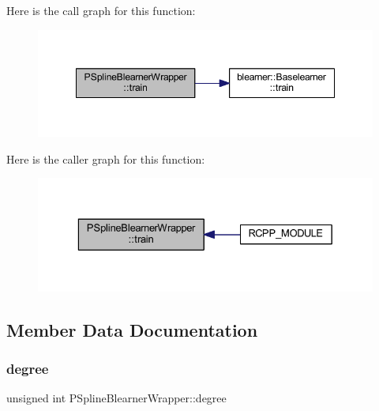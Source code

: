 Here is the call graph for this function\+:
\nopagebreak
\begin{figure}[H]
\begin{center}
\leavevmode
\includegraphics[width=348pt]{class_p_spline_blearner_wrapper_a10193fd93f82c2c333e704d7cb67dd27_cgraph}
\end{center}
\end{figure}
Here is the caller graph for this function\+:
\nopagebreak
\begin{figure}[H]
\begin{center}
\leavevmode
\includegraphics[width=329pt]{class_p_spline_blearner_wrapper_a10193fd93f82c2c333e704d7cb67dd27_icgraph}
\end{center}
\end{figure}


\subsection{Member Data Documentation}
\mbox{\label{class_p_spline_blearner_wrapper_a3828bb3245f840146ed83b0f9b3777f3}} 
\subsubsection{\texorpdfstring{degree}{degree}}
{\footnotesize\ttfamily unsigned int P\+Spline\+Blearner\+Wrapper\+::degree\hspace{0.3cm}{\ttfamily [private]}}

\mbox{\label{class_p_spline_blearner_wrapper_ac9e6f943e55476a93df376020818f44c}} 
